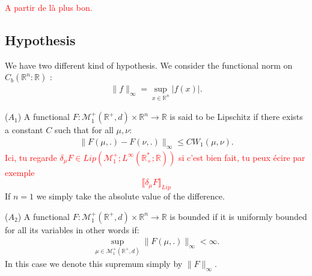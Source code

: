 \documentclass[11pt,a4paper]{article}
\newcommand{\RR}{\mathbb{R}}
\newcommand{\MC}{\mathcal{M}}
\newcommand{\red}[1]{\textcolor{red}{#1}}
\begin{document}
\red{A partir de là plus bon.}
\subsection{Hypothesis}
We have two different kind of hypothesis. We consider the functional norm on $C_b\left(\RR^n:\RR\right)$ :
\begin{align*}
    \| f\|_{\infty} = \sup\limits_{x \in \RR^n} |f(x)|.
\end{align*}

($A_1$) A functional $F : \MC_1^+(\RR^+,d)\times \RR^n \to \RR$ is said to be Lipschitz if there exists a constant $C$ such that for all $\mu,\nu$:
\begin{align*}
    \|F(\mu,.) - F(\nu,.)\|_{\infty} \leq C W_1(\mu,\nu).
\end{align*}
\red{ Ici, tu regarde $\delta_\mu F \in Lip(\MC^+_1;L^\infty(\mathbb{R}_+^*;\mathbb{R}))$ si c'est bien fait, tu peux écire par exemple
\[\llbracket \delta_\mu F\rrbracket_{Lip} \]}
If $n = 1$ we simply take the absolute value of the difference.

($A_2$) A functional $F : \MC_1^+(\RR^+,d)\times \RR^n \to \RR$ is bounded if it is uniformly bounded for all its variables in other words if:
\begin{align*}
    \sup\limits_{\mu \in \MC_1^+(\RR^+,d)}\|F(\mu,.) \|_{\infty} < \infty. 
\end{align*}
In this case we denote this supremum simply by $\|F\|_{\infty}$.
\end{document}
